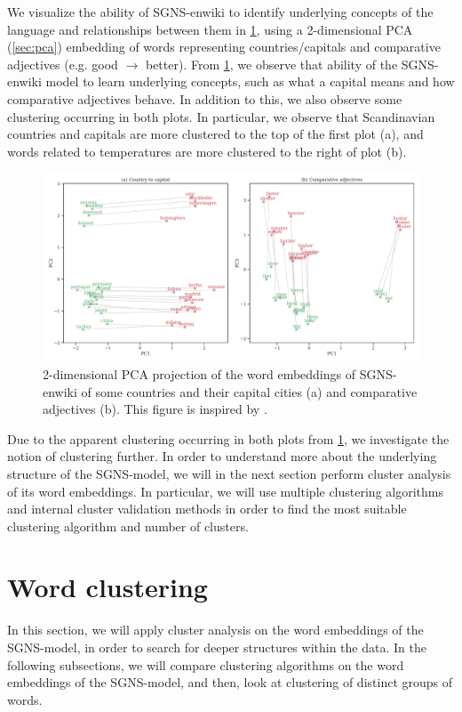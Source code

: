 We visualize the ability of SGNS-enwiki to identify underlying concepts of the language and relationships between them in \cref{fig:sgns-enwiki-word-to-word-relations-pca-2d}, using a 2-dimensional PCA (\cref{sec:pca}) embedding of words representing countries/capitals and comparative adjectives (e.g. good $\rightarrow$ better). From \cref{fig:sgns-enwiki-word-to-word-relations-pca-2d}, we observe that ability of the SGNS-enwiki model to learn underlying concepts, such as what a capital means and how comparative adjectives behave. In addition to this, we also observe some clustering occurring in both plots. In particular, we observe that Scandinavian countries and capitals are more clustered to the top of the first plot (a), and words related to temperatures are more clustered to the right of plot (b).
\begin{figure}[H]
   \centering
   \includegraphics[width=\textwidth]{thesis/figures/word-to-word-relationships-pca-2d.pdf}
 \caption{2-dimensional PCA projection of the word embeddings of SGNS-enwiki of some countries and their capital cities (a) and comparative adjectives (b). This figure is inspired by \cite[Figure 2]{mikolov2013b}.}
 \label{fig:sgns-enwiki-word-to-word-relations-pca-2d}
\end{figure}

Due to the apparent clustering occurring in both plots from \cref{fig:sgns-enwiki-word-to-word-relations-pca-2d}, we investigate the notion of clustering further. In order to understand more about the underlying structure of the SGNS-model, we will in the next section perform cluster analysis of its word embeddings. In particular, we will use multiple clustering algorithms and internal cluster validation methods in order to find the most suitable clustering algorithm and number of clusters.

\section{Word clustering}
In this section, we will apply cluster analysis on the word embeddings of the SGNS-model, in order to search for deeper structures within the data. In the following subsections, we will compare clustering algorithms on the word embeddings of the SGNS-model, and then, look at clustering of distinct groups of words.

